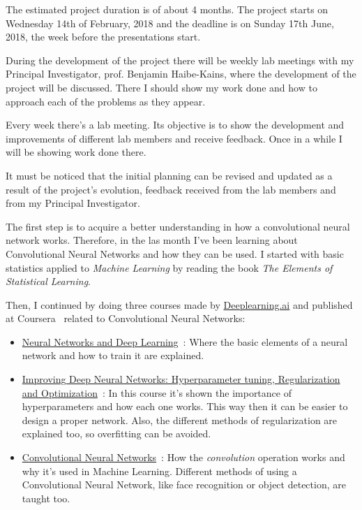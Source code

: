 



The estimated project duration is of about 4 months. The project starts on Wednesday 14th of 
February, 2018 and the deadline is on Sunday 17th June, 2018, the week before the 
presentations start.

During the development of the project there will be weekly lab meetings with my Principal
Investigator, prof. Benjamin Haibe-Kains, where the development of the project will be 
discussed. There I should show my work done and how to approach each of the problems as
they appear.

Every week there's a lab meeting. Its objective is to show the development and improvements 
of different lab members and receive feedback. Once in a while I will be showing work
done there.

It must be noticed that the initial planning can be revised and updated as a result of the 
project's evolution, feedback received from the lab members and from my Principal Investigator. 



The first step is to acquire a better understanding in how a convolutional neural network works.
Therefore, in the las month I've been learning about Convolutional Neural Networks and how they
can be used. 
I started with basic statistics applied to \emph{Machine Learning} by reading the book 
\emph{The Elements of Statistical Learning}.~\cite{neural:elements-statistical-learning}

Then, I continued by doing three courses made by \href{https://www.deeplearning.ai}{Deeplearning.ai}
and published at Coursera~\cite{neural:coursera} related to Convolutional Neural Networks:
\begin{itemize}
  \item \href{https://www.coursera.org/learn/neural-networks-deep-learning}{Neural Networks and 
    Deep Learning}~\cite{neural:coursera:nn}: Where the basic elements of a neural network and how
    to train it are explained.

  \item \href{https://www.coursera.org/learn/deep-neural-network}{Improving Deep Neural Networks: 
    Hyperparameter tuning, Regularization and Optimization}~\cite{neural:coursera:nn-hyperparameters}: 
    In this course it's shown the importance of hyperparameters and how each one works. 
    This way then it can be easier to design a proper network. Also, the different methods 
    of regularization are explained too, so overfitting can be avoided.

  \item \href{https://www.coursera.org/learn/convolutional-neural-networks}{Convolutional Neural 
    Networks}~\cite{neural:coursera:cnn}:
    How the \emph{convolution} operation works and why it's used in Machine Learning. 
    Different methods of using a Convolutional Neural Network, like face recognition or 
    object detection, are taught too.
\end{itemize}

